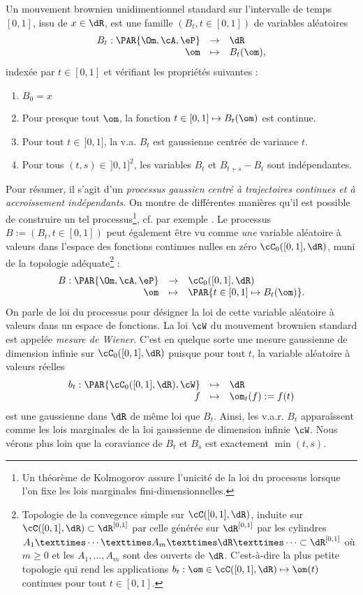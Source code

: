 Un mouvement brownien unidimentionnel standard sur l'intervalle de temps
$[0,1]$, issu de $x\in\dR$, est une famille $(B_t,t\in[0,1])$ de variables
aléatoires
$$
\begin{array}[c]{rcl}
B_t:\PAR{\Om,\cA,\eP}&\to&\dR\\
\om&\mapsto&B_t(\om),
\end{array}
$$
indexée par $t\in[0,1]$ et vérifiant les propriétés suivantes :
\begin{enumerate}
\item $B_0=x$
\item Pour presque tout $\om$, la fonction $t\in[0,1]\mapsto B_t(\om)$ est
  continue.
\item Pour tout $t\in\,]0,1]$, la v.a. $B_t$ est gaussienne centrée de
  variance $t$.
\item Pour tous $(t,s)\in\,]0,1]^2$, les variables $B_t$ et $B_{t+s}-B_t$ sont
  indépendantes.
\end{enumerate}
Pour résumer, il s'agit d'un \emph{processus gaussien centré à trajectoires
  continues et à accroissement indépendants}. On montre de différentes
manières qu'il est possible de construire un tel processus\footnote{Un
  théorème de Kolmogorov assure l'unicité de la loi du processus lorsque l'on
  fixe les lois marginales fini-dimensionnelles.}, cf. par exemple
\cite{karatzas-shreve}. Le processus $B:=(B_t,t\in[0,1])$ peut également être
vu comme \emph{une} variable aléatoire à valeurs dans l'espace des fonctions
continues nulles en zéro $\cC_0([0,1],\dR)$, muni de la topologie
adéquate\footnote{Topologie de la convegence simple sur $\cC([0,1],\dR)$,
  induite sur $\cC([0,1],\dR)\subset\dR^{[0,1]}$ par celle générée sur
  $\dR^{[0,1]}$ par les cylindres $A_1 × \cdots × A_m × \dR × \cdots \subset
  \dR^{[0,1]}$ où $m\geq 0$ et les $A_1,\ldots,A_m$ sont des ouverts de $\dR$.
  C'est-à-dire la plus petite topologie qui rend les applications
  $b_t:\om\in\cC([0,1],\dR)\mapsto \om(t)$ continues pour tout $t\in[0,1]$.} :
$$
\begin{array}[c]{rcl}
B:\PAR{\Om,\cA,\eP}&\to&\cC_0([0,1],\dR)\\
\om&\mapsto&\PAR{t\in[0,1]\mapsto B_t(\om)}.
\end{array}
$$
On parle de loi du processus pour désigner la loi de cette variable
aléatoire à valeurs dans un espace de fonctions. La loi $\cW$ du mouvement
brownien standard est appelée \emph{mesure de Wiener}. C'est en quelque sorte
une mesure gaussienne de dimension infinie sur $\cC_0([0,1],\dR)$ puisque pour
tout $t$, la variable aléatoire à valeurs réelles
$$
\begin{array}[c]{rcl}
b_t:\PAR{\cC_0([0,1],\dR),\cW}&\mapsto&\dR\\
f&\mapsto& \om_t(f):=f(t)
\end{array}
$$
est une gaussienne dans $\dR$ de même loi que $B_t$.  Ainsi, les v.a.r.
$B_t$ apparaîssent comme les lois marginales de la loi gaussienne de dimension
infinie $\cW$. Nous vérons plus loin que la coraviance de $B_t$ et $B_s$ est
exactement $\min(t,s)$.

